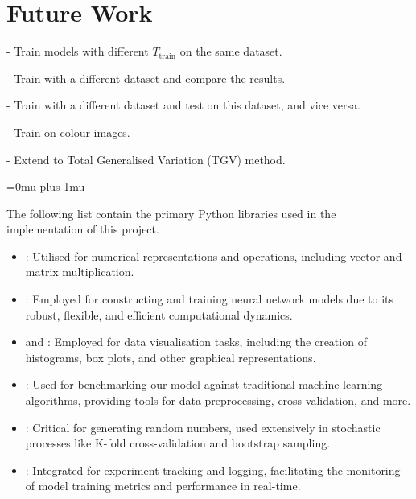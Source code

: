 \documentclass[12pt]{article}
\begin{document}

\section{Future Work}


- Train models with different $T_{\text{train}}$ on the same dataset.

- Train with a different dataset and compare the results.

- Train with a different dataset and test on this dataset, and vice versa.

- Train on colour images.

- Extend to Total Generalised Variation (TGV) method.

\newpage



\Urlmuskip=0mu plus 1mu\relax
\printbibliography


The following list contain the primary Python libraries used in the implementation of this project.

\vspace{-6pt}

\begin{itemize}
\setlength\itemsep{-0.3em}
  \item {}: Utilised for numerical representations and operations, including vector and matrix multiplication.
  \item {}: Employed for constructing and training neural network models due to its robust, flexible, and efficient computational dynamics.
  \item {} and : Employed for data visualisation tasks, including the creation of histograms, box plots, and other graphical representations.
  \item {}: Used for benchmarking our model against traditional machine learning algorithms, providing tools for data preprocessing, cross-validation, and more.
  \item {}: Critical for generating random numbers, used extensively in stochastic processes like K-fold cross-validation and bootstrap sampling.
  \item {}: Integrated for experiment tracking and logging, facilitating the monitoring of model training metrics and performance in real-time.
\end{itemize}
\end{document}

